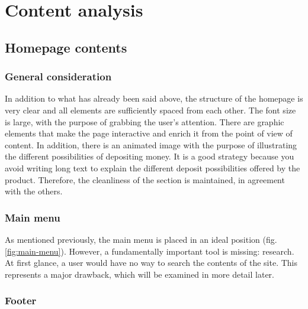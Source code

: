 \section{Content analysis}

\subsection{Homepage contents}

\subsubsection{General consideration}

In addition to what has already been said above, the structure of the 
homepage is very clear and all elements are sufficiently spaced from each 
other. The font size is large, with the purpose of grabbing the user's 
attention. There are graphic elements that make the page interactive and 
enrich it from the point of view of content. In addition, there is an 
animated image with the purpose of illustrating the different possibilities 
of depositing money. It is a good strategy because you avoid writing long 
text to explain the different deposit possibilities offered by the 
product. Therefore, the cleanliness of the section is maintained, in 
agreement with the others.

\subsubsection{Main menu}

As mentioned previously, the main menu is placed in an ideal position 
(fig. \ref{fig:main-menu}). However, a fundamentally important tool is 
missing: research. At first glance, a user would have no way to search the 
contents of the site. This represents a major drawback, which will be 
examined in more detail later.

\subsubsection{Footer}

